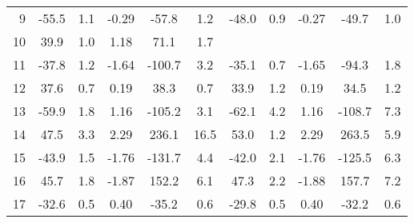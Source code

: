 \begin{tabular}{rSSSSSSSSSS}
         9 &               -55.5 &                          1.1 &    -0.29 &             -57.8 &                      1.2 &                      -48.0 &                                 0.9 &           -0.27 &                    -49.7 &                               1.0 \\
        10 &                39.9 &                          1.0 &     1.18 &              71.1 &                      1.7 &                            &                                     &                 &                          &                                   \\
        11 &               -37.8 &                          1.2 &    -1.64 &            -100.7 &                      3.2 &                      -35.1 &                                 0.7 &           -1.65 &                    -94.3 &                               1.8 \\
        12 &                37.6 &                          0.7 &     0.19 &              38.3 &                      0.7 &                       33.9 &                                 1.2 &            0.19 &                     34.5 &                               1.2 \\
        13 &               -59.9 &                          1.8 &     1.16 &            -105.2 &                      3.1 &                      -62.1 &                                 4.2 &            1.16 &                   -108.7 &                               7.3 \\
        14 &                47.5 &                          3.3 &     2.29 &             236.1 &                     16.5 &                       53.0 &                                 1.2 &            2.29 &                    263.5 &                               5.9 \\
        15 &               -43.9 &                          1.5 &    -1.76 &            -131.7 &                      4.4 &                      -42.0 &                                 2.1 &           -1.76 &                   -125.5 &                               6.3 \\
        16 &                45.7 &                          1.8 &    -1.87 &             152.2 &                      6.1 &                       47.3 &                                 2.2 &           -1.88 &                    157.7 &                               7.2 \\
        17 &               -32.6 &                          0.5 &     0.40 &             -35.2 &                      0.6 &                      -29.8 &                                 0.5 &            0.40 &                    -32.2 &                               0.6 \\

\end{tabular}
